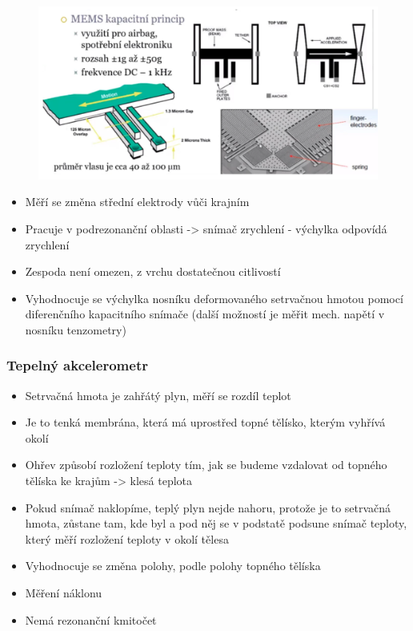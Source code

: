 \begin{figure}[h]
    \centering
    \includegraphics[scale = 0.50]{img/MEMSVIB.png}
\end{figure}

\begin{itemize}
    \item Měří se změna střední elektrody vůči krajním
    \item Pracuje v podrezonanční oblasti -> snímač zrychlení - výchylka odpovídá zrychlení
    \item Zespoda není omezen, z vrchu dostatečnou citlivostí
    \item Vyhodnocuje se výchylka nosníku deformovaného setrvačnou hmotou pomocí diferenčního kapacitního snímače (další možností je měřit mech. napětí v nosníku tenzometry)
\end{itemize}

\subsubsection*{Tepelný akcelerometr}
\begin{itemize}
    \item Setrvačná hmota je zahřátý plyn, měří se rozdíl teplot
    \item Je to tenká membrána, která má uprostřed topné tělísko, kterým vyhřívá okolí 
    \item Ohřev způsobí rozložení teploty tím, jak se budeme vzdalovat od topného tělíska ke krajům -> klesá teplota
    \item Pokud snímač naklopíme, teplý plyn nejde nahoru, protože je to setrvačná hmota, zůstane tam, kde byl a pod něj se v podstatě podsune snímač teploty, který měří rozložení teploty v okolí tělesa
    \item Vyhodnocuje se změna polohy, podle polohy topného tělíska
    \item Měření náklonu
    \item Nemá rezonanční kmitočet
\end{itemize}

